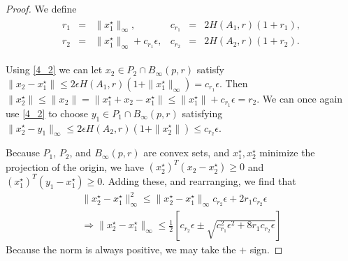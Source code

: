 \documentclass{article}
\theoremstyle{case}
\numberwithin{theorem}{subsection}
\newcommand{\bpr}{{B_{\infty}\left(p, r\right)}}
\begin{document}
\begin{proof}
We define
\begin{align*}
\begin{array}{rclrcl}
r_1 &=& \|x_1^{\star}\|_{\infty},
& c_{r_1} &=& 2H\left(A_1, r\right)\left(1 + r_1\right), \\
r_2 &=&  \|x_1^{\star}\|_{\infty} + c_{r_1}\epsilon,
& c_{r_2} &=&  2H\left(A_2, r\right)\left(1 + r_2\right).
\end{array}
\end{align*}

Using \cref{4_2} we can let $x_2 \in P_2 \cap \bpr$ satisfy 
$\|x_2 - x_1^{\star}\| \le 2\epsilon H(A_1, r) \left(1 + \|x_1^{\star}\|_{\infty}\right) = c_{r_1}\epsilon$.
Then
$\|x_2^{\star}\| \le \|x_2\| = \|x_1^{\star} + x_2 - x_1^{\star}\| \le \|x_1^{\star}\| + c_{r_1}\epsilon = r_2$.
We can once again use \cref{4_2} to choose $y_1 \in P_1 \cap \bpr$ satisfying 
$\|x_2^{\star} - y_1\|_{\infty} \le 2\epsilon H(A_2, r)\left(1 + \|x_2^{\star}\|\right) \le c_{r_2}\epsilon$.

Because $P_1$, $P_2$, and $\bpr$ are convex sets, and $x_1^{\star}, x_2^{\star}$ minimize the projection of the origin, we have
$\left(x_2^{\star}\right)^T \left(x_2 - x_2^{\star}\right)\ge 0$ and
$\left(x_1^{\star}\right)^T \left(y_1 - x_1^{\star}\right)\ge 0$.
Adding these, and rearranging, we find that
\begin{align*}
\|x_2^{\star} - x_1^{\star}\|_{\infty}^2 \le \|x_2^{\star} - x_1^{\star}\|_{\infty} c_{r_2}\epsilon + 2r_1c_{r_2}\epsilon \\
\Longrightarrow \|x_2^{\star} - x_1^{\star}\|_{\infty} \le \frac 1 2 \left[c_{r_2}\epsilon \pm \sqrt{c_{r_1}^2\epsilon^2 + 8r_1c_{r_2}\epsilon}\right]
\end{align*}
Because the norm is always positive, we may take the $+$ sign.


\end{proof}
\end{document}
